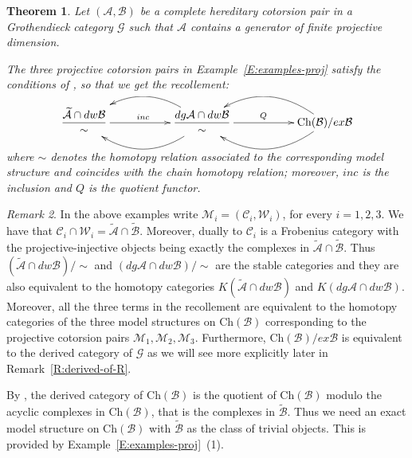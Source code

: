 \documentclass[11pt,a4paper,reqno]{amsart}
\newcommand{\A}{\mathcal{A}}
\newcommand{\B}{\mathcal{B}}
\newcommand{\C}{\mathcal{C}}
\newcommand{\G}{\mathcal{G}}
\newcommand{\M}{\mathcal{M}}
\newcommand{\W}{\mathcal{W}}
\newcommand{\Ch}{\mathrm{Ch}}
\theoremstyle{plain}
\newtheorem{thm}{Theorem}[section]
\theoremstyle{definition}
\theoremstyle{remark}
\newtheorem{rem}[thm]{Remark}
\begin{document}
\begin{thm}\label{T:recollement-proj} Let $(\A, \B)$ be a complete hereditary cotorsion pair in a  Grothendieck category $\G$ such that $\A$ contains a generator of finite projective dimension.

The three projective cotorsion pairs in Example~\ref{E:examples-proj} satisfy the conditions of \cite[Theorem 3.5]{G7}, so that we get the recollement:

%
%
%
%
%
%
%
%
%
\[
\xymatrix{\dfrac{\widetilde{\A}\cap dw \B}{\sim} \ar[rr]^{inc} &&\dfrac{dg{\A}\cap dw \B}{\sim} \ar@/^2pc/
[ll]\ar@/_2pc/[ll] \ar[rr]^{Q}
&&{\Ch(\B)/ex\B}\ar@/^2pc/ [ll] \ar@/_2pc/ [ll] }
\]
\vskip 0.7cm

where $\sim$ denotes the homotopy relation associated to the corresponding model structure and coincides with the chain homotopy relation; moreover, $inc$ is the inclusion and $Q$ is the quotient functor.
\end{thm}
%
%
%
%
\begin{rem}\label{R:proj-recoll} In the above examples write $\M_i=(\C_i, \W_i)$, for every $i=1,2,3$.  We have that $\C_i\cap\W_i=\widetilde{\A}\cap\widetilde{\B}$. Moreover, dually to \cite[Proposition 3.2]{G7} $\C_i$ is a Frobenius category with the projective-injective objects being exactly the complexes in $\widetilde{\A}\cap\widetilde{\B}$. Thus $(\widetilde{\A}\cap dw\B)/\sim$ and $(dg{\A}\cap dw\B)/\sim$ are the stable categories and they are also equivalent to the homotopy categories $K(\widetilde{\A}\cap dw \B)$ and $K(dg{\A}\cap dw \B)$. Moreover,  all the three terms in the recollement are equivalent to the homotopy categories of the three model structures on $\Ch(\B)$ corresponding to the projective cotorsion pairs $\M_1, \M_2, \M_3$. Furthermore, $\Ch(\B)/ex\B$ is equivalent to the derived category of $\G$ as we will see more explicitly later in Remark~\ref{R:derived-of-R}.
\end{rem}
\vskip 0.5cm
By \cite{Nee90}, the derived category of $\Ch(\B)$ is the quotient of $\Ch(\B)$ modulo the acyclic complexes in  $\Ch(\B)$, that is the complexes in $\widetilde{\B}$. Thus we need an exact model structure on $\Ch(\B)$ with $\widetilde{\B}$ as the class of trivial objects. This is provided by Example~\ref{E:examples-proj}~(1).
%
\end{document}
